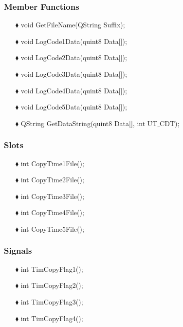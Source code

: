 \begin{enumerate}
\subsubsection{Member Functions }
\begin{enumerate}
	\item [$\blacklozenge$] void GetFileName(QString Suffix);
	\item [$\blacklozenge$] void LogCode1Data(quint8 Data[]);
	\item [$\blacklozenge$] void LogCode2Data(quint8 Data[]);
	\item [$\blacklozenge$] void LogCode3Data(quint8 Data[]);
	\item [$\blacklozenge$] void LogCode4Data(quint8 Data[]);
	\item [$\blacklozenge$] void LogCode5Data(quint8 Data[]);
	\item [$\blacklozenge$] QString GetDataString(quint8 Data[], int UT$\_$CDT);
	
	
\end{enumerate}


\subsubsection{Slots}
\begin{enumerate}
	\item [$\blacklozenge$] int CopyTime1File();
	\item [$\blacklozenge$] int CopyTime2File();
	\item [$\blacklozenge$] int CopyTime3File();
	\item [$\blacklozenge$] int CopyTime4File();
	\item [$\blacklozenge$] int CopyTime5File();
	
\end{enumerate}

\subsubsection{Signals}
\begin{enumerate}
	\item [$\blacklozenge$] int TimCopyFlag1();
	\item [$\blacklozenge$] int TimCopyFlag2();
	\item [$\blacklozenge$] int TimCopyFlag3();
	\item [$\blacklozenge$] int TimCopyFlag4();
	
\end{enumerate}


\end{enumerate}
